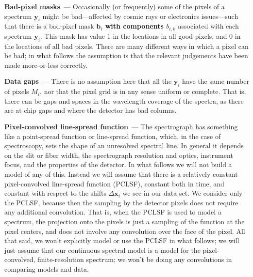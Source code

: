 \documentclass[modern, linenumbers]{aastex631}
\renewcommand{\paragraph}[1]{\medskip\par\noindent\textbf{#1}~---}
\newcommand{\modified}[1]{\textcolor{Emerald}{\textbf{#1}}}
\begin{document}
\paragraph{Bad-pixel masks}
Occasionally (or frequently) some of the pixels of a spectrum \modified{$\mathbf{y}_i$} might be bad---affected by cosmic rays or electronics issues---such that there is a bad-pixel mask \modified{$\mathbf{b}_i$ with components $b_{i,k}$} associated with each spectrum \modified{$\mathbf{y}_i$}.
This mask has value 1 in the locations in all good pixels, and 0 in the locations of all bad pixels.
There are many different ways in which a pixel can be bad; in what follows the assumption is that the relevant judgements have been made more-or-less correctly.

\paragraph{Data gaps}
There is no assumption here that all the \modified{$\mathbf{y}_i$} have the same number of pixels $M_i$, nor that the pixel grid is in any sense uniform or complete.
That is, there can be gaps and spaces in the wavelength coverage of the spectra, as there are at chip gaps and where the detector has bad columns.

\paragraph{Pixel-convolved line-spread function}
The spectrograph has something like a point-spread function or line-spread function, which, in the case of spectroscopy, sets the shape of an unresolved spectral line.
In general it depends on the slit or fiber width, the spectrograph resolution and optics, instrument focus, and the properties of the detector.
In what follows we will not build a model of any of this.
Instead we will assume that there is a relatively constant pixel-convolved line-spread function (PCLSF), constant both in time, and constant with respect to the shifts \modified{$\Delta\mathbf{x}_i$} we see in our data set.
We consider only the PCLSF, because then the sampling by the detector pixels does not require any additional convolution.
That is, when the PCLSF is used to model a spectrum, the projection onto the pixels is just a sampling of the function at the pixel centers, and does not involve any convolution over the face of the pixel.
All that said, we won't explicitly model or use the PCLSF in what follows; we will just assume that our continuous spectral model is a model for the pixel-convolved, finite-resolution spectrum; we won't be doing any convolutions in comparing models and data.
\end{document}
